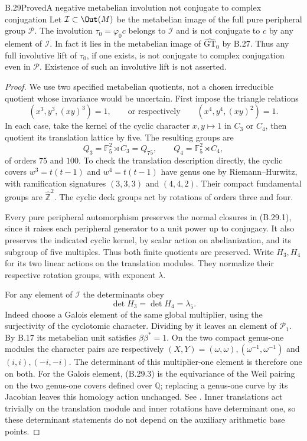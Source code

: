 \begin{statement}{B.29}{Proved}{A negative metabelian involution not conjugate to complex conjugation}
Let $\mathcal I\subset\Out(M)$ be the metabelian image
of the full pure peripheral group $\mathcal P$.
The involution $\tau_0=\varphi_0c$ belongs to $\mathcal I$
and is not conjugate to $c$ by any element of $\mathcal I$.
In fact it lies in the metabelian image of
$\widehat{\mathrm{GT}}_0$ by B.27. Thus any full
involutive lift of $\tau_0$, if one exists, is not
conjugate to complex conjugation even in $\mathcal P$.
Existence of such an involutive lift is not asserted.
\end{statement}
\begin{proof}
We use two specified metabelian quotients, not a chosen
irreducible quotient whose invariance would be uncertain.
First impose the triangle relations
\[
 (x^3,y^3,(xy)^3)=1,
 \qquad\text{or respectively}\qquad
 (x^4,y^4,(xy)^2)=1.
 \tag{B.29.1}
\]
In each case, take the kernel of the cyclic character
$x,y\mapsto1$ in $C_3$ or $C_4$, then quotient its
translation lattice by five. The resulting groups are
\[
 Q_3=\mathbb F_5^2\rtimes C_3=Q_{75},\qquad
 Q_4=\mathbb F_5^2\rtimes C_4,
 \tag{B.29.2}
\]
of orders $75$ and $100$. To check the translation
description directly, the cyclic covers
$w^3=t(t-1)$ and $w^4=t(t-1)$ have genus one by
Riemann--Hurwitz, with ramification signatures
$(3,3,3)$ and $(4,4,2)$. Their compact fundamental
groups are $\widehat{\mathbb Z}^2$. The cyclic deck
groups act by rotations of orders three and four.

Every pure peripheral automorphism preserves the
normal closures in (B.29.1), since it raises each
peripheral generator to a unit power up to conjugacy.
It also preserves the indicated cyclic kernel, by
scalar action on abelianization, and its subgroup of
five multiples. Thus both finite quotients are
preserved. Write $H_3,H_4$ for its two linear actions
on the translation modules. They normalize their
respective rotation groups, with exponent $\lambda$.

For any element of $\mathcal I$ the determinants obey
\[
                    \det H_3=\det H_4=\lambda_5.
 \tag{B.29.3}
\]
Indeed choose a Galois element of the same global
multiplier, using the surjectivity of the cyclotomic
character. Dividing by it leaves an element of
$\mathcal P_1$. By B.17 its metabelian unit satisfies
$\beta\beta^*=1$. On the two compact genus-one
modules the character pairs are respectively
$(X,Y)=(\omega,\omega),(\omega^{-1},\omega^{-1})$
and $(i,i),(-i,-i)$. The determinant of this
multiplier-one element is therefore one on both.
For the Galois element, (B.29.3) is the equivariance
of the Weil pairing on the two genus-one covers
defined over $\mathbb Q$; replacing a genus-one curve
by its Jacobian leaves this homology action unchanged.
See \cite[V, \S8, p.~221]{PBC_MilneEC2021}.
Inner translations act trivially on the translation
module and inner rotations have determinant one,
so these determinant statements do not depend on
the auxiliary arithmetic base points.


\end{proof}
